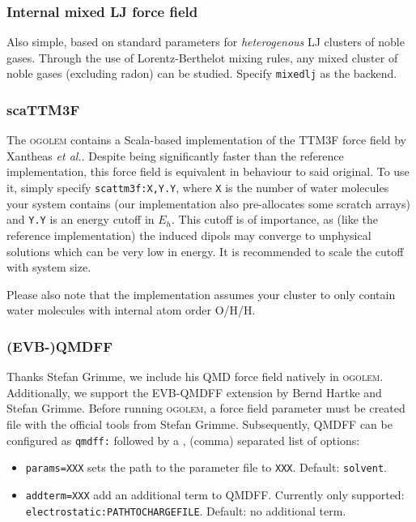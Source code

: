 \documentclass[a4paper,10pt]{scrbook}
\newcommand{\ogo}{\textsc{ogolem}}
\begin{document}
\subsubsection{Internal mixed LJ force field}
Also simple, based on standard parameters for \emph{heterogenous} LJ clusters of
noble gases. Through the
use of Lorentz-Berthelot mixing rules, any mixed cluster of noble gases
(excluding radon) can be studied. Specify \texttt{mixedlj} as the backend.

\subsubsection{scaTTM3F}
The \ogo{} contains a Scala-based implementation of the TTM3F force field by
Xantheas \emph{et al.}. Despite being significantly faster than the reference
implementation, this force field is equivalent in behaviour to said original. To
use it, simply specify \texttt{scattm3f:X,Y.Y}, where \texttt{X} is the number
of water molecules your system contains (our implementation also pre-allocates 
some
scratch arrays) and \texttt{Y.Y} is an energy cutoff in $E_h$. This cutoff is of
importance, as (like the reference implementation) the induced dipols may
converge to unphysical solutions which can be very low in energy. It is
recommended to scale the cutoff with system size.

Please also note that the implementation assumes your cluster to only contain
water molecules with internal atom order O/H/H.

\subsubsection{(EVB-)QMDFF}
Thanks Stefan Grimme, we include his QMD force field natively in \ogo{}. 
Additionally,
we support the EVB-QMDFF extension by Bernd Hartke and Stefan Grimme. Before 
running \ogo{}, a force field parameter must be created file with the 
official tools from Stefan Grimme. Subsequently, QMDFF can be configured as
\texttt{qmdff:} followed by a , (comma) separated list of options:
\begin{itemize}
 \item \texttt{params=XXX} sets the path to the parameter file to \texttt{XXX}. Default: \texttt{solvent}.
 \item \texttt{addterm=XXX} add an additional term to QMDFF. Currently only supported: \texttt{electrostatic:PATHTOCHARGEFILE}. Default: no additional term.
\end{itemize}
\end{document}
